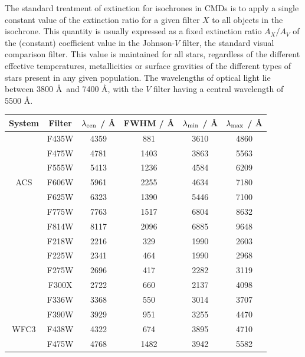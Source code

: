 \documentclass[12pt, a4paper]{report}
\begin{document}
The standard treatment of extinction for isochrones in CMDs is to apply a single constant value of the extinction ratio for a given filter $X$ to all objects in the isochrone. This quantity is usually expressed as a fixed extinction ratio $A_{X}/A_{V}$ of the (constant) coefficient value in the Johnson-$V$ filter, the standard visual comparison filter. This value is maintained for all stars, regardless of the different effective temperatures, metallicities or surface gravities of the different types of stars present in any given population. The wavelengths of optical light lie between 3800 \AA\ and 7400 \AA, with the $V$ filter having a central wavelength of 5500 \AA.

\begin{table}
\begin{center}
\begin{tabular}{cccccc}
\hline
System & Filter & $\lambda_{\textnormal{cen}}$ / \AA & FWHM / \AA & $\lambda_{\textnormal{min}}$ / \AA & $\lambda_{\textnormal{max}}$ / \AA \\
\hline
& F435W & 4359 & 881 & 3610 & 4860 \\ %
& F475W & 4781 & 1403 & 3863 & 5563 \\ %
& F555W & 5413 & 1236 & 4584 & 6209 \\ %
ACS & F606W & 5961 & 2255 & 4634 & 7180 \\ %
& F625W & 6323 & 1390 & 5446 & 7100 \\ %
& F775W & 7763 & 1517 & 6804 & 8632 \\ %
& F814W & 8117 & 2096 & 6885 & 9648 \\ %
\hline
& F218W & 2216 & 329 & 1990 & 2603 \\ %
& F225W & 2341 & 464 & 1990 & 2968 \\ %
& F275W & 2696 & 417 & 2282 & 3119 \\ %
& F300X & 2722 & 660 & 2137 & 4098 \\ %
& F336W & 3368 & 550 & 3014 & 3707 \\ %
& F390W & 3929 & 951 & 3255 & 4470 \\ %
WFC3 & F438W & 4322 & 674 & 3895 & 4710 \\ %
& F475W & 4768 & 1482 & 3942 & 5582 \\ %

\end{tabular}
\end{center}
\end{table}
\end{document}
